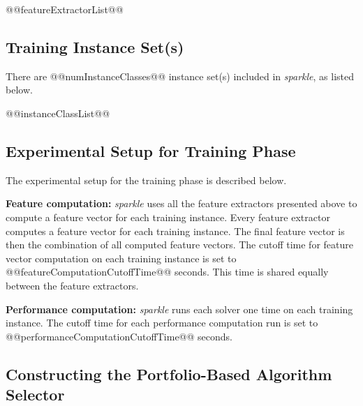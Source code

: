 \documentclass[british]{article}
\newif\iftest
\begin{document}
\begin{enumerate}
@@featureExtractorList@@
\end{enumerate}

\subsection{Training Instance Set(s)}
\label{sec:Train_Instance_Sets}
There are @@numInstanceClasses@@ instance set(s) included in \emph{sparkle}, as listed below.

\begin{enumerate}
@@instanceClassList@@
\end{enumerate}

\iftest
\subsection{Test Instance Set}
\label{sec:Test_Instance_Set}

\begin{itemize}
\item Testing set: @@testInstanceClass@@, consisting of @@numInstanceInTestInstanceClass@@ instances
\end{itemize}
\fi

\subsection{Experimental Setup for Training Phase}
\label{sec:Experimental_Setup_for_Training_Phase}

The experimental setup for the training phase is described below.

\textbf{Feature computation:} \emph{sparkle} uses all the feature extractors presented above to compute a feature vector for each training instance. Every feature extractor computes a feature vector for each training instance. The final feature vector is then the combination of all computed feature vectors. The cutoff time for feature vector computation on each training instance is set to @@featureComputationCutoffTime@@ seconds. This time is shared equally between the feature extractors.

\textbf{Performance computation:} \emph{sparkle} runs each solver one time on each training instance. The cutoff time for each performance computation run is set to @@performanceComputationCutoffTime@@ seconds.

\subsection{Constructing the Portfolio-Based Algorithm Selector}
\label{sec:Portfolio}
\end{document}
